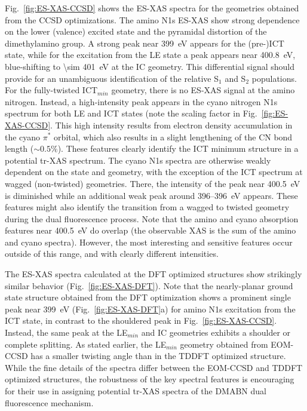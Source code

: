 \documentclass[journal=jacsat,manuscript=article]{achemso}
\begin{document}
Fig.~\ref{fig:ES-XAS-CCSD} shows the ES-XAS spectra for the geometries obtained from the CCSD optimizations. The amino N1s ES-XAS show strong dependence on the lower (valence) excited state and the pyramidal distortion of the dimethylamino group. A strong peak near \SI{399}{eV} appears for the (pre-)ICT state, while for the excitation from the LE state a peak appears near \SI{400.8}{eV}, blue-shifting to \SI{\sim 401}{eV} at the IC geometry. This differential signal should provide for an unambiguous identification of the relative S$_1$ and S$_2$ populations. For the fully-twisted ICT$_{min}$ geometry, there is no ES-XAS signal at the amino nitrogen. Instead, a high-intensity peak appears in the cyano nitrogen N1s spectrum for both LE and ICT states (note the scaling factor in Fig.~\ref{fig:ES-XAS-CCSD}. This high intensity results from electron density accumulation in the cyano $\pi^*$ orbital, which also results in a slight lengthening of the CN bond length ($\sim 0.5\%$). These features clearly identify the ICT minimum structure in a potential tr-XAS spectrum. The cyano N1s spectra are otherwise weakly dependent on the state and geometry, with the exception of the ICT spectrum at wagged (non-twisted) geometries. There, the intensity of the peak near \SI{400.5}{eV} is diminished while an additional weak peak around 396--\SI{396}{eV} appears. These features might also identify the transition from a wagged to twisted geometry during the dual fluorescence process. Note that the amino and cyano absorption features near \SI{400.5}{eV} do overlap (the observable XAS is the sum of the amino and cyano spectra). However, the most interesting and sensitive features occur outside of this range, and with clearly different intensities.

The ES-XAS spectra calculated at the DFT optimized structures show strikingly similar behavior (Fig.~\ref{fig:ES-XAS-DFT}). Note that the nearly-planar ground state structure obtained from the DFT optimization shows a prominent single peak near \SI{399}{eV} (Fig.~\ref{fig:ES-XAS-DFT}a) for amino N1s excitation from the ICT state, in contrast to the shouldered peak in Fig.~\ref{fig:ES-XAS-CCSD}. Instead, the same peak at the LE$_{min}$ and IC geometries exhibits a shoulder or complete splitting. As stated earlier, the LE$_{min}$ geometry obtained from EOM-CCSD has a smaller twisting angle than in the TDDFT optimized structure. While the fine details of the spectra differ between the EOM-CCSD and TDDFT optimized structures, the robustness of the key spectral features is encouraging for their use in assigning potential tr-XAS spectra of the DMABN dual fluorescence mechanism.
\end{document}
